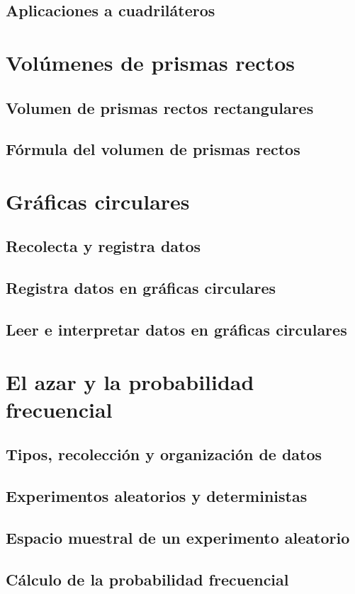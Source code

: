 \documentclass[11pt]{book}
\begin{document}
\subsection{Aplicaciones a cuadriláteros}

\newpage \thispagestyle{plain}

\section{Vol\'umenes de prismas rectos}

\subsection{Volumen de prismas rectos rectangulares}

\subsection{Fórmula del volumen de prismas rectos}


\newpage \thispagestyle{plain}

\section{Gráficas circulares}

\subsection{Recolecta y registra datos}

\subsection{Registra datos en gráficas circulares}

\subsection{Leer e interpretar datos en gráficas circulares}

\newpage \thispagestyle{plain}

\section{El azar y la probabilidad frecuencial}

\subsection{Tipos, recolección y organización de datos}

\subsection{Experimentos aleatorios y deterministas}

\subsection{Espacio muestral de un experimento aleatorio}

\subsection{Cálculo de la probabilidad frecuencial}
\end{document}
